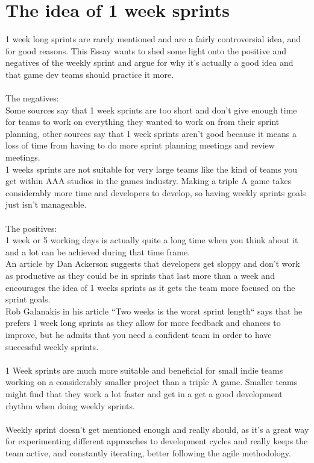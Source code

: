 \documentclass{scrartcl}
\begin{document}
\section{The idea of 1 week sprints}
1 week long sprints are rarely mentioned and are a fairly controversial idea, and for good reasons. This Essay wants to shed some light onto the positive and negatives of the weekly sprint and argue for why it's actually a good idea and that game dev teams should practice it more.
\\~\\
The negatives:\\
Some sources say that 1 week sprints are too short and don't give enough time for teams to work on everything they wanted to work on from their sprint planning, other sources say that 1 week sprints aren't good because it means a loss of time from having to do more sprint planning meetings and review meetings.\\
1 weeks sprints are not suitable for very large teams like the kind of teams you get within AAA studios in the games industry. Making a triple A game takes considerably more time and developers to develop, so having weekly sprints goals just isn't manageable.
\\~\\
The positives:\\
1 week or 5 working days is actually quite a long time when you think about it and a lot can be achieved during that time frame.\\
An article by Dan Ackerson suggests that developers get sloppy and don't work as productive as they could be in sprints that last more than a week and encourages the idea of 1 weeks sprints as it gets the team more focused on the sprint goals\cite{six}.\\
Rob Galanakis in his article ``Two weeks is the worst sprint length`` says that he prefers 1 week long sprints as they allow for more feedback and chances to improve, but he admits that you need a confident team in order to have successful weekly sprints\cite{seven}.\\~\\
1 Week sprints are much more suitable and beneficial for small indie teams working on a considerably smaller project than a triple A game. Smaller teams might find that they work a lot faster and get in a get a good development rhythm when doing weekly sprints.
\\~\\
Weekly sprint doesn't get mentioned enough and really should, as it's a great way for experimenting different approaches to development cycles and really keeps the team active, and constantly iterating, better following the agile methodology.
\end{document}
